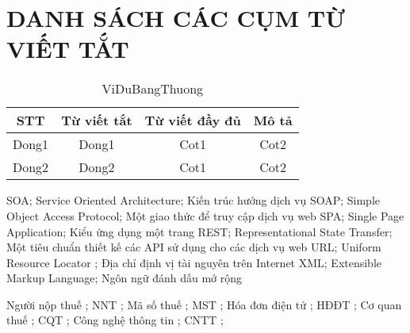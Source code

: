 \newpage
\section*{\centering       DANH SÁCH CÁC CỤM TỪ VIẾT TẮT}










\begin{table}[h]
    \centering
    \begin{tabular}{|c|c|c|c|}
        \hline
        STT   & Từ viết tắt & Từ viết đầy đủ & Mô tả \\
        \hline
        Dong1 & Dong1       & Cot1           & Cot2  \\
        \hline
        Dong2 & Dong2       & Cot1           & Cot2  \\
        \hline
    \end{tabular}
    \caption{ViDuBangThuong}
\end{table} 




\newpage







SOA; Service Oriented Architecture; Kiến trúc hướng dịch vụ
SOAP; Simple Object Access Protocol; Một giao thức để truy cập dịch vụ web
SPA; Single Page Application; Kiểu ứng dụng một trang
REST; Representational State Transfer; Một tiêu chuẩn thiết kế các API sử dụng cho các dịch vụ web
URL; Uniform Resource Locator ; Địa chỉ định vị tài nguyên trên Internet
XML; Extensible Markup Language; Ngôn ngữ đánh dấu mở rộng

Người nộp thuế ; NNT ;
Mã số thuế ; MST ;
Hóa đơn điện tử ; HĐĐT ;
Cơ quan thuế ; CQT ;
Công nghệ thông tin ; CNTT ;

